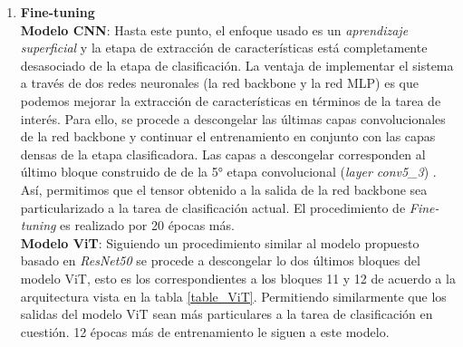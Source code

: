 {\begin{enumerate}
    \item \textbf{Fine-tuning}\\
          \textbf{Modelo CNN}: Hasta este punto, el enfoque usado es un \textit{aprendizaje superficial}
          y la etapa de extracción de características está completamente desasociado de la etapa de
          clasificación. La ventaja de implementar el sistema a través de dos redes neuronales (la
          red backbone y la red MLP) es que podemos mejorar la extracción de características en
          términos de la tarea de interés. Para ello, se procede a descongelar las últimas capas
          convolucionales de la red backbone y continuar el entrenamiento en conjunto con las capas
          densas de la etapa clasificadora. Las capas a descongelar corresponden al último bloque
          construido de de la 5° etapa convolucional (\textit{layer conv5\_3}) \cite{he2016deep}.
          Así, permitimos que el tensor obtenido a la salida de la red backbone sea particularizado
          a la tarea de clasificación actual. El procedimiento de \textit{Fine-tuning} es realizado
          por 20 épocas más.\\
          \textbf{Modelo ViT}: Siguiendo un procedimiento similar al modelo propuesto basado en
          \textit{ResNet50} se procede a descongelar lo dos últimos bloques del modelo ViT, esto es
          los correspondientes a los bloques 11 y 12 de acuerdo a la arquitectura vista en la tabla
          \ref{table_ViT}. Permitiendo similarmente que los salidas del modelo ViT sean más particulares
          a la tarea de clasificación en cuestión. 12 épocas más de entrenamiento le siguen a este
          modelo.


\end{enumerate}}

